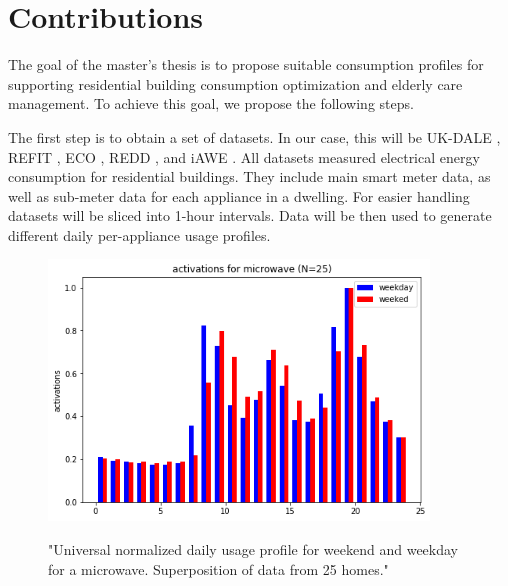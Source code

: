 
\chapter{Contributions} %

\label{Chapter5} %


The goal of the master's thesis is to propose suitable consumption profiles for supporting residential building consumption optimization and elderly care management.
To achieve this goal, we propose the following steps.

The first step is to obtain a set of datasets. In our case, this will be UK-DALE \cite{UKDALE}, REFIT \cite{REFIT}, ECO \cite{ECO}, REDD \cite{REDD}, and iAWE \cite{iAWE}.
All datasets measured electrical energy consumption for residential buildings. 
They include main smart meter data, as well as sub-meter data for each appliance in a dwelling. 
For easier handling datasets will be sliced into 1-hour intervals. 
Data will be then used to generate different daily per-appliance usage profiles.

\begin{figure}[H]
	\centering
	\caption{"Universal normalized daily usage profile for weekend and weekday for a microwave. Superposition of data from 25 homes."}
	\includegraphics[width=0.9\textwidth]{../Figures/microwave_norm_n25.png}
	\label{fig:UniNormMicrowave}
\end{figure}

